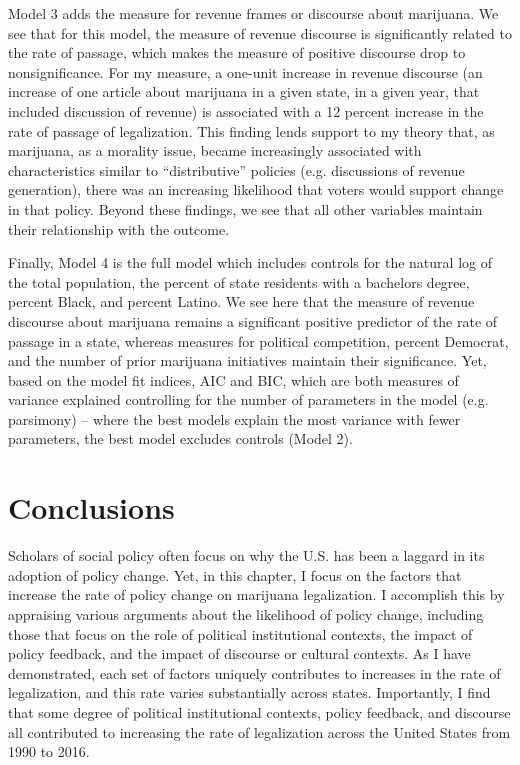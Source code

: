 Model 3 adds the measure for revenue frames or discourse about marijuana. We see that for this model, the measure of revenue discourse is significantly related to the rate of passage, which makes the measure of positive discourse drop to nonsignificance. For my measure, a one-unit increase in revenue discourse (an increase of one article about marijuana in a given state, in a given year, that included discussion of revenue) is associated with a 12 percent increase in the rate of passage of legalization. This finding lends support to my theory that, as marijuana, as a morality issue, became increasingly associated with characteristics similar to ``distributive'' policies (e.g. discussions of revenue generation), there was an increasing likelihood that voters would support change in that policy. Beyond these findings, we see that all other variables maintain their relationship with the outcome. 


Finally, Model 4 is the full model which includes controls for the natural log of the total population, the percent of state residents with a bachelors degree, percent Black, and percent Latino. We see here that the measure of revenue discourse about marijuana remains a significant positive predictor of the rate of passage in a state, whereas measures for political competition, percent Democrat, and the number of prior marijuana initiatives maintain their significance. Yet, based on the model fit indices, AIC and BIC, which are both measures of variance explained controlling for the number of parameters in the model (e.g. parsimony) -- where the best models explain the most variance with fewer parameters, the best model excludes controls (Model 2).


\section{Conclusions}

Scholars of social policy often focus on why the U.S. has been a laggard in its adoption of policy change.  Yet, in this chapter, I focus on the factors that increase the rate of policy change on marijuana legalization. I accomplish this by appraising various arguments about the likelihood of policy change, including those that focus on the role of political institutional contexts, the impact of policy feedback, and the impact of discourse or cultural contexts. As I have demonstrated, each set of factors uniquely contributes to increases in the rate of legalization, and this rate varies substantially across states. Importantly, I find that some degree of political institutional contexts, policy feedback, and discourse all contributed to increasing the rate of legalization across the United States from 1990 to 2016. 

